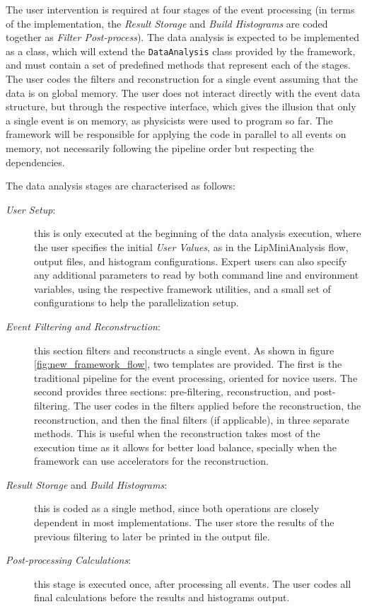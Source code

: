 The user intervention is required at four stages of the event processing (in terms of the implementation, the \textit{Result Storage} and \textit{Build Histograms} are coded together as \textit{Filter Post-process}). The data analysis is expected to be implemented as a class, which will extend the \texttt{DataAnalysis} class provided by the framework, and must contain a set of predefined methods that represent each of the stages. The user codes the filters and reconstruction for a single event assuming that the data is on global memory. The user does not interact directly with the event data structure, but through the respective interface, which gives the illusion that only a single event is on memory, as physicists were used to program so far. The framework will be responsible for applying the code in parallel to all events on memory, not necessarily following the pipeline order but respecting the dependencies.

The data analysis stages are characterised as follows:

\begin{description}
	\item[\textit{User Setup}:] this is only executed at the beginning of the data analysis execution, where the user specifies the initial \textit{User Values}, as in the LipMiniAnalysis flow, output files, and histogram configurations. Expert users can also specify any additional parameters to read by both command line and environment variables, using the respective framework utilities, and a small set of configurations to help the parallelization setup.
	\item[\textit{Event Filtering and Reconstruction}:] this section filters and reconstructs a single event. As shown in figure \ref{fig:new_framework_flow}, two templates are provided. The first is the traditional pipeline for the event processing, oriented for novice users. The second provides three sections: pre-filtering, reconstruction, and post-filtering. The user codes in the filters applied before the reconstruction, the reconstruction, and then the final filters (if applicable), in three separate methods. This is useful when the reconstruction takes most of the execution time as it allows for better load balance, specially when the framework can use accelerators for the reconstruction.
	\item[\textit{Result Storage} and \textit{Build Histograms}:] this is coded as a single method, since both operations are closely dependent in most implementations. The user store the results of the previous filtering to later be printed in the output file.
	\item[\textit{Post-processing Calculations}:] this stage is executed once, after processing all events. The user codes all final calculations before the results and histograms output.
\end{description}

